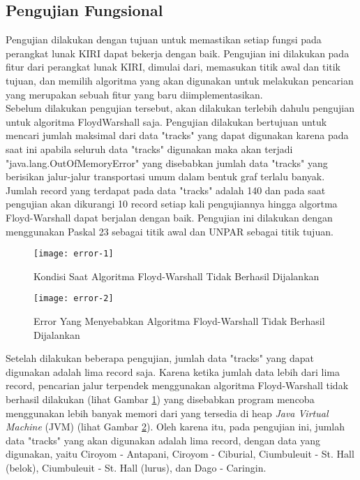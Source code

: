 \subsection{Pengujian Fungsional}
\label{subsec:pengujianfungsional}
Pengujian dilakukan dengan tujuan untuk memastikan setiap fungsi pada perangkat lunak KIRI dapat bekerja dengan baik. Pengujian ini dilakukan pada fitur dari perangkat lunak KIRI, dimulai dari, memasukan titik awal dan titik tujuan, dan memilih algoritma yang akan digunakan untuk melakukan pencarian yang merupakan sebuah fitur yang baru diimplementasikan.
\\
Sebelum dilakukan pengujian tersebut, akan dilakukan terlebih dahulu pengujian untuk algoritma FloydWarshall saja. Pengujian dilakukan bertujuan untuk mencari jumlah maksimal dari data "tracks" yang dapat digunakan karena pada saat ini apabila seluruh data "tracks" digunakan maka akan terjadi "java.lang.OutOfMemoryError" yang disebabkan jumlah data "tracks" yang berisikan jalur-jalur transportasi umum dalam bentuk graf terlalu banyak. Jumlah record yang terdapat pada data "tracks" adalah 140 dan pada saat pengujian akan dikurangi 10 record setiap kali pengujiannya hingga algortma Floyd-Warshall dapat berjalan dengan baik. Pengujian ini dilakukan dengan menggunakan Paskal 23 sebagai titik awal dan UNPAR sebagai titik tujuan.

\begin{figure}[H]
    \centering
    \texttt{[image: error-1]}
    \caption{Kondisi Saat Algoritma Floyd-Warshall Tidak Berhasil Dijalankan}
    \label{fig:error1}
\end{figure}

\begin{figure}[H]
    \centering
    \texttt{[image: error-2]}
    \caption{Error Yang Menyebabkan Algoritma Floyd-Warshall Tidak Berhasil Dijalankan}
    \label{fig:error2}
\end{figure}

\noindent
Setelah dilakukan beberapa pengujian, jumlah data "tracks" yang dapat digunakan adalah lima record saja. Karena ketika jumlah data lebih dari lima record, pencarian jalur terpendek menggunakan algoritma Floyd-Warshall tidak berhasil dilakukan (lihat Gambar \ref{fig:error1}) yang disebabkan program mencoba menggunakan lebih banyak memori dari yang tersedia di heap \textit{Java Virtual Machine} (JVM) (lihat Gambar \ref{fig:error2}). Oleh karena itu, pada pengujian ini, jumlah data "tracks" yang akan digunakan adalah lima record, dengan data yang digunakan, yaitu Ciroyom - Antapani, Ciroyom - Ciburial, Ciumbuleuit - St. Hall (belok), Ciumbuleuit - St. Hall (lurus), dan Dago - Caringin.

